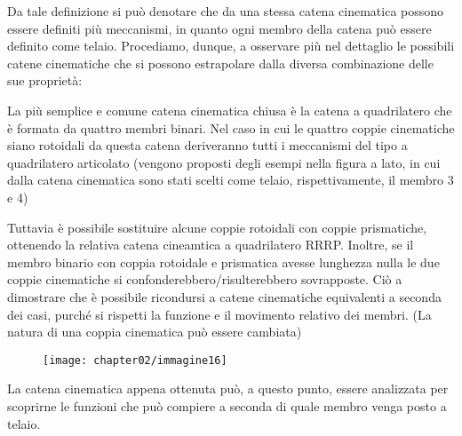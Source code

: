 Da tale definizione si può denotare che da una stessa catena cinematica possono essere definiti più meccanismi, in quanto ogni membro della catena può essere definito come telaio.
Procediamo, dunque, a osservare più nel dettaglio le possibili catene cinematiche che si possono estrapolare dalla diversa combinazione delle sue proprietà:\newline

La più semplice e comune catena cinematica chiusa è la catena a quadrilatero che è formata da quattro  membri binari.\newline
\noindent Nel caso in cui le quattro coppie cinematiche siano rotoidali da questa catena deriveranno tutti i meccanismi del tipo a quadrilatero articolato (vengono proposti degli esempi nella figura a lato, in cui dalla catena cinematica sono stati scelti come telaio, rispettivamente, il membro 3 e 4)



Tuttavia è possibile sostituire alcune coppie rotoidali con coppie prismatiche, ottenendo la relativa catena cineamtica a quadrilatero RRRP. Inoltre, se il membro binario con coppia rotoidale e prismatica avesse lunghezza nulla le due coppie cinematiche si confonderebbero/risulterebbero sovrapposte.
Ciò a dimostrare che è possibile ricondursi a catene cinematiche equivalenti a seconda dei casi, purché si rispetti la funzione e il movimento relativo dei membri. (La natura di una coppia cinematica può essere cambiata)

\begin{figure}[h]
\centering
\texttt{[image: chapter02/immagine16]}
\end{figure}

La catena cinematica appena ottenuta può, a questo punto, essere analizzata per scoprirne le funzioni che può compiere a seconda di quale membro venga posto a telaio.

